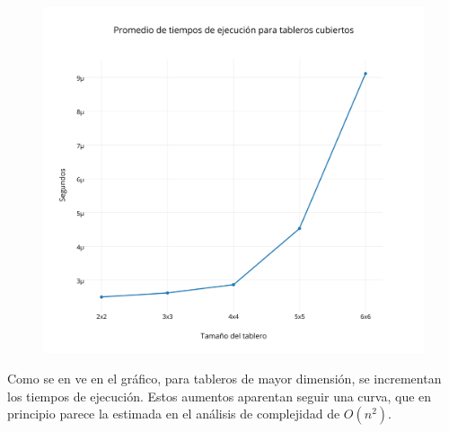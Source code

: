  \begin{figure}[h!]
   \begin{center}
	\includegraphics[scale=0.3]{../src/ej3/Mediciones/cubiertos/PromedioInforme.png} 
   \end{center}
 \end{figure}

Como se en ve en el gr\'afico, para tableros de mayor dimensi\'on, se incrementan los tiempos de ejecuci\'on. Estos aumentos aparentan seguir una curva, que en principio parece la estimada en el an\'alisis de complejidad de $O(n^{2})$.\\





\newpage

